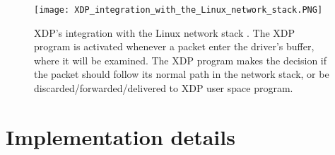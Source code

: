 \begin{figure}[H]
	\centering
	\texttt{[image: XDP\_integration\_with\_the\_Linux\_network\_stack.PNG]}
	\caption{XDP’s integration with the Linux network stack \cite{hoiland_jorgensen_express_2018}. The XDP program is activated whenever a packet enter the driver's buffer, where it will be examined. The XDP program makes the decision if the packet should follow its normal path in the network stack, or be discarded/forwarded/delivered to XDP user space program.}\label{fig:approach_design:xdp_architecture}
\end{figure}


\section{Implementation details}











